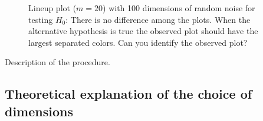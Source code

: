 \documentclass[12]{article}
\begin{document}
\begin{figure}[hbtp]
   \centering
       \caption{Lineup plot ($m=20$) with 100 dimensions of random noise for testing $H_0$: There is no difference among the plots. When the alternative hypothesis is true the observed plot should have the largest separated colors. Can you identify the observed plot?}
       \label{fig:test_category}
\end{figure}




{\color{red} Description of the procedure. }\\

\subsection{Theoretical explanation of the choice of dimensions}
\end{document}
